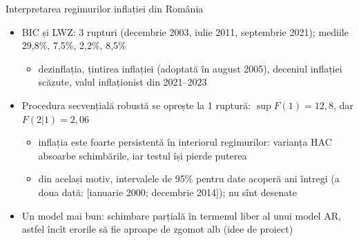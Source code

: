 \begin{frame}{Interpretarea regimurilor inflației din România}
\itemsize{\small}
\begin{itemize}
    \item BIC și LWZ: 3 rupturi (decembrie 2003, iulie 2011, septembrie 2021); mediile 29{,}8\%, 7{,}5\%, 2{,}2\%, 8{,}5\%
    \begin{itemize}
        \item dezinflația, țintirea inflației (adoptată în august 2005), deceniul inflației scăzute, valul inflaționist din 2021--2023
    \end{itemize}
    \item Procedura secvențială robustă se oprește la 1 ruptură: $\sup F(1) = 12{,}8$, dar $F(2|1) = 2{,}06$
    \begin{itemize}
        \item inflația este foarte persistentă în interiorul regimurilor: varianța HAC absoarbe schimbările, iar testul își pierde puterea
        \item din același motiv, intervalele de 95\% pentru date acoperă ani întregi (a doua dată: [ianuarie 2000; decembrie 2014]); nu sînt desenate
    \end{itemize}
    \item Un model mai bun: schimbare parțială în termenul liber al unui model AR, astfel încît erorile să fie aproape de zgomot alb (idee de proiect)
\end{itemize}
\end{frame}

